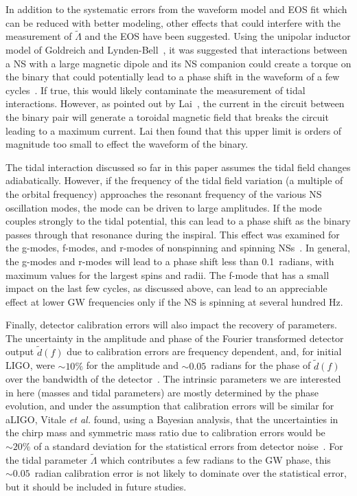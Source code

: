 \documentclass[twocolumn,prd,amssymb,aps,nofootinbib,showpacs,epsf]{revtex4}
\begin{document}
In addition to the systematic errors from the waveform model and EOS fit which can be reduced with better modeling, other effects that could interfere with the measurement of $\tilde\Lambda$ and the EOS have been suggested. Using the unipolar inductor model of Goldreich and Lynden-Bell~\cite{GoldreichLyndenBell1969}, it was suggested that interactions between a NS with a large magnetic dipole and its NS companion could create a torque on the binary that could potentially lead to a phase shift in the waveform of a few cycles~\cite{Piro2012}. If true, this would likely contaminate the measurement of tidal interactions. However, as pointed out by Lai~\cite{Lai2012}, the current in the circuit between the binary pair will generate a toroidal magnetic field that breaks the circuit leading to a maximum current. Lai then found that this upper limit is orders of magnitude too small to effect the waveform of the binary.

The tidal interaction discussed so far in this paper assumes the tidal field changes adiabatically. However, if the frequency of the tidal field variation (a multiple of the orbital frequency) approaches the resonant frequency of the various NS oscillation modes, the mode can be driven to large amplitudes. If the mode couples strongly to the tidal potential, this can lead to a phase shift as the binary passes through that resonance during the inspiral. This effect was examined for the g-modes, f-modes, and r-modes of nonspinning and spinning NSs~\cite{Lai1994, HoLai1999}. In general, the g-modes and r-modes will lead to a phase shift less than 0.1~radians, with maximum values for the largest spins and radii. The f-mode that has a small impact on the last few cycles, as discussed above, can lead to an appreciable effect at lower GW frequencies only if the NS is spinning at several hundred Hz. 


Finally, detector calibration errors will also impact the recovery of parameters. The uncertainty in the amplitude and phase of the Fourier transformed detector output $\tilde d(f)$ due to calibration errors are frequency dependent, and, for initial LIGO, were $\sim 10\%$ for the amplitude and $\sim 0.05$~radians for the phase of $\tilde d(f)$ over the bandwidth of the detector~\cite{VitaleDelPozzoLi2012}. The intrinsic parameters we are interested in here (masses and tidal parameters) are mostly determined by the phase evolution, and under the assumption that calibration errors will be similar for aLIGO, Vitale {\it et al.} found, using a Bayesian analysis, that the uncertainties in the chirp mass and symmetric mass ratio due to calibration errors would be $\sim 20\%$ of a standard deviation for the statistical errors from detector noise~\cite{VitaleDelPozzoLi2012}. For the tidal parameter $\tilde\Lambda$ which contributes a few radians to the GW phase, this $\sim 0.05$~radian calibration error is not likely to dominate over the statistical error, but it should be included in future studies.
\end{document}
